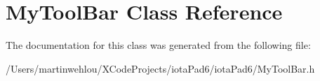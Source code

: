 \hypertarget{interface_my_tool_bar}{
\section{MyToolBar Class Reference}
\label{interface_my_tool_bar}
}


The documentation for this class was generated from the following file:\begin{DoxyCompactItemize}
\item 
/Users/martinwehlou/XCodeProjects/iotaPad6/iotaPad6/MyToolBar.h\end{DoxyCompactItemize}
